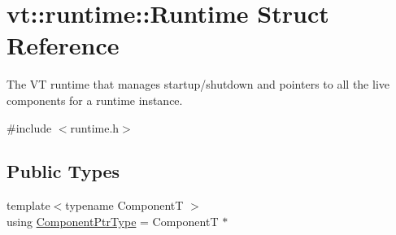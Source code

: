 \hypertarget{structvt_1_1runtime_1_1_runtime}{}\section{vt\+:\+:runtime\+:\+:Runtime Struct Reference}
\label{structvt_1_1runtime_1_1_runtime}


The VT runtime that manages startup/shutdown and pointers to all the live components for a runtime instance.  




{\ttfamily \#include $<$runtime.\+h$>$}

\subsection*{Public Types}
\begin{DoxyCompactItemize}
\item 
{\footnotesize template$<$typename ComponentT $>$ }\\using \hyperlink{structvt_1_1runtime_1_1_runtime_a0893bf0a8c03b898e8ab66b52cec80ad}{Component\+Ptr\+Type} = ComponentT $\ast$
\end{DoxyCompactItemize}

